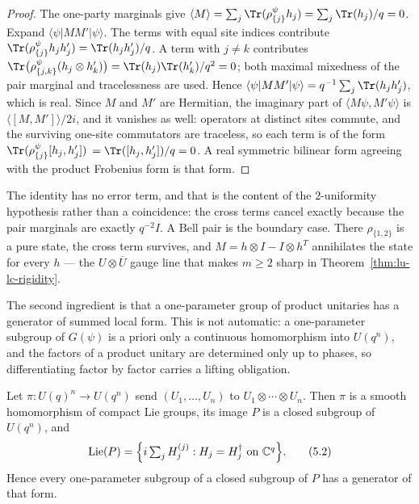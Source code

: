 \begin{proof}
The one-party marginals give
\(\langle M\rangle=\sum_j\Tr(\rho^\psi_{\{j\}}h_j)
 =\sum_j\Tr(h_j)/q=0\).  Expand \(\langle\psi\rvert MM'\lvert\psi\rangle\).
The terms with equal site indices contribute
\(\Tr(\rho^\psi_{\{j\}}h_jh'_j)=\Tr(h_jh'_j)/q\).  A term with \(j\ne k\)
contributes
\(\Tr\bigl(\rho^\psi_{\{j,k\}}(h_j\otimes h'_k)\bigr)
 =\Tr(h_j)\Tr(h'_k)/q^2=0\); both maximal mixedness of the pair marginal
and tracelessness are used.  Hence
\(\langle\psi\rvert MM'\lvert\psi\rangle=q^{-1}\sum_j\Tr(h_jh'_j)\), which
is real.  Since \(M\) and \(M'\) are Hermitian, the imaginary part of
\(\langle M\psi,M'\psi\rangle\) is
\(\langle[M,M']\rangle/2i\), and it vanishes as well: operators at distinct
sites commute, and the surviving one-site commutators are traceless, so
each term is of the form \(\Tr(\rho^\psi_{\{j\}}[h_j,h'_j])\)
\(=\Tr([h_j,h'_j])/q=0\).  A real symmetric bilinear form agreeing with
the product Frobenius form is that form.
\end{proof}

The identity has no error term, and that is the content of the
\(2\)-uniformity hypothesis rather than a coincidence: the cross terms
cancel exactly because the pair marginals are exactly \(q^{-2}I\).  A Bell
pair is the boundary case.  There \(\rho_{\{1,2\}}\) is a pure state, the
cross term survives, and \(M=h\otimes I-I\otimes h^{T}\) annihilates the
state for every \(h\) --- the \(U\otimes\overline U\) gauge line that makes
\(m\geq2\) sharp in Theorem~\ref{thm:lu-lc-rigidity}.

The second ingredient is that a one-parameter group of product unitaries
has a generator of summed local form.  This is not automatic: a
one-parameter subgroup of \(G(\psi)\) is a priori only a continuous
homomorphism into \(U(q^n)\), and the factors of a product unitary are
determined only up to phases, so differentiating factor by factor carries a
lifting obligation.

\begin{lemma}\label{lem:product-lie}
Let \(\pi:U(q)^n\to U(q^n)\) send \((U_1,\ldots,U_n)\) to
\(U_1\otimes\cdots\otimes U_n\).  Then \(\pi\) is a smooth homomorphism of
compact Lie groups, its image \(P\) is a closed subgroup of \(U(q^n)\), and
\[
 \operatorname{Lie}(P)
  =\Bigl\{i\textstyle\sum_{j}H_j^{(j)}:
    H_j=H_j^\dagger\ \text{on }\mathbb C^q\Bigr\}.       \tag{5.2}
\]
Hence every one-parameter subgroup of a closed subgroup of \(P\) has a
generator of that form.
\end{lemma}


